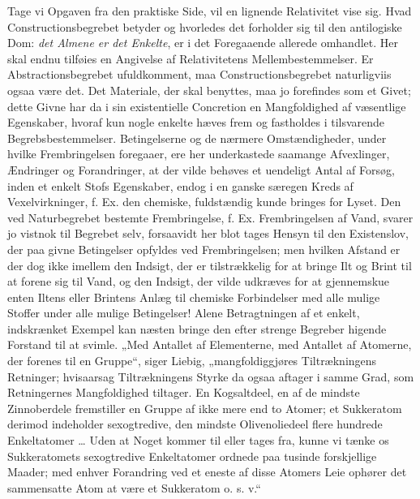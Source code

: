 \documentclass[11pt]{book}
\newcommand{\opage}[1]{\marginnote{\footnotesize\textit{[#1]}}}
\begin{document}
Tage vi Opgaven fra den praktiske Side, vil en lignende Relativitet
vise sig. Hvad Constructionsbegrebet betyder og hvorledes det forholder
sig til den antilogiske Dom: \emph{det Almene er det Enkelte}, er i det
Foregaaende allerede omhandlet. Her skal endnu tilføies en Angivelse af
Relativitetens Mellembestemmelser. Er Abstractionsbegrebet
ufuldkomment, maa Constructionsbegrebet naturligviis ogsaa være det.
Det Materiale, der skal benyttes, maa jo forefindes som et Givet; dette
Givne har da i sin existentielle Concretion en
\opage{198} \setcounter{footnote}{0}%
Mangfoldighed af væsentlige Egenskaber, hvoraf kun nogle enkelte hæves
frem og fastholdes i tilsvarende Begrebsbestemmelser. Betingelserne og
de nærmere Omstændigheder, under hvilke Frembringelsen foregaaer, ere
her underkastede saamange Afvexlinger, Ændringer og Forandringer, at
der vilde behøves et uendeligt Antal af Forsøg, inden et enkelt Stofs
Egenskaber, endog i en ganske særegen Kreds af Vexelvirkninger, f. Ex.
den chemiske, fuldstændig kunde bringes for Lyset. Den ved
Naturbegrebet bestemte Frembringelse, f. Ex. Frembringelsen af Vand,
svarer jo vistnok til Begrebet selv, forsaavidt her blot tages Hensyn
til den Existenslov, der paa givne Betingelser opfyldes ved
Frembringelsen; men hvilken Afstand er der dog ikke imellem den
Indsigt, der er tilstrækkelig for at bringe Ilt og Brint til at forene
sig til Vand, og den Indsigt, der vilde udkræves for at gjennemskue
enten Iltens eller Brintens Anlæg til chemiske Forbindelser med alle
mulige Stoffer under alle mulige Betingelser! Alene Betragtningen af et
enkelt, indskrænket Exempel kan næsten bringe den efter strenge
Begreber higende Forstand til at svimle. „Med Antallet af Elementerne,
med Antallet af Atomerne, der forenes til en Gruppe“, siger Liebig,
„mangfoldiggjøres Tiltrækningens Retninger; hvisaarsag Tiltrækningens
Styrke da ogsaa aftager i samme Grad, som Retningernes Mangfoldighed
tiltager. En Kogsaltdeel, en af de mindste Zinnoberdele fremstiller en
Gruppe af ikke mere end to Atomer; et Sukkeratom derimod indeholder
sexogtredive, den mindste Olivenoliedeel flere hundrede Enkeltatomer
\dots{} Uden at Noget kommer til eller tages fra, kunne vi tænke os
Sukkeratomets sexogtredive Enkeltatomer ordnede paa tusinde
forskjellige Maader; med enhver Forandring ved et eneste af disse
Atomers Leie ophører det sammensatte Atom at være et Sukkeratom
o. s. v.“
\end{document}
